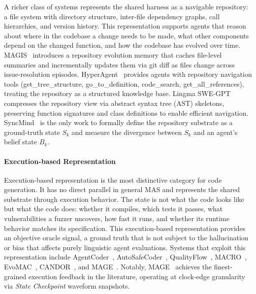 A richer class of systems represents the shared harness as a
navigable repository: a file system with directory structure,
inter-file dependency graphs, call hierarchies, and version
history. This representation supports agents that reason about
where in the codebase a change needs to be made, what other
components depend on the changed function, and how the codebase
has evolved over time. MAGIS~\cite{Tao2024Magis} introduces a
repository evolution memory that caches file-level summaries and
incrementally updates them via git diff as files change across
issue-resolution episodes. HyperAgent~\cite{Phan2024HyperAgent}
provides agents with repository navigation tools
(get\_tree\_structure, go\_to\_definition, code\_search,
get\_all\_references), treating the repository as a structured
knowledge base. Lingma SWE-GPT~\cite{Ma2024Lingma} compresses the
repository view via abstract syntax tree (AST) skeletons,
preserving function signatures and class definitions to enable
efficient navigation. SyncMind~\cite{Guo2025SyncMind} is the only
work to formally define the repository substrate as a ground-truth
state $S_k$ and measure the divergence between $S_k$ and an
agent's belief state $B_k$.

\paragraph{Execution-based Representation}

Execution-based representation is the most distinctive category
for code generation. It has no direct parallel in general MAS and
represents the shared substrate through execution behavior. The
state is not what the code looks like but what the code does:
whether it compiles, which tests it passes, what vulnerabilities
a fuzzer uncovers, how fast it runs, and whether its runtime
behavior matches its specification. This execution-based
representation provides an objective oracle signal, a ground
truth that is not subject to the hallucination or bias that
affects purely linguistic agent evaluations. Systems that exploit
this representation include
AgentCoder~\cite{huang2023agentcoder},
AutoSafeCoder~\cite{Nunez2024AutoSafeCoder},
QualityFlow~\cite{Hu2025QualityFlow},
MACRO~\cite{Rahman2025MACRO}, EvoMAC~\cite{Hu2025EvoMAC},
CANDOR~\cite{Xu2025Hallucination}, and
MAGE~\cite{Zhao2024MAGE}. Notably,
MAGE~\cite{Zhao2024MAGE} achieves the finest-grained execution
feedback in the literature, operating at clock-edge granularity
via \textit{State Checkpoint} waveform snapshots.

